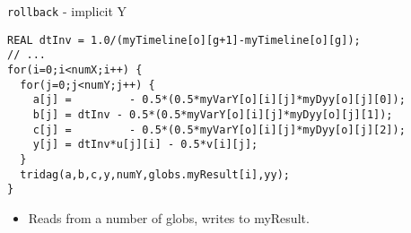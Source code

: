 \documentclass{beamer}
\begin{document}
\begin{frame}[fragile]{\texttt{rollback} - implicit Y}
\begin{lstlisting}[basicstyle=\tiny\ttfamily]
REAL dtInv = 1.0/(myTimeline[o][g+1]-myTimeline[o][g]);
// ...
for(i=0;i<numX;i++) {
  for(j=0;j<numY;j++) {
    a[j] =         - 0.5*(0.5*myVarY[o][i][j]*myDyy[o][j][0]);
    b[j] = dtInv - 0.5*(0.5*myVarY[o][i][j]*myDyy[o][j][1]);
    c[j] =         - 0.5*(0.5*myVarY[o][i][j]*myDyy[o][j][2]);
    y[j] = dtInv*u[j][i] - 0.5*v[i][j];
  }
  tridag(a,b,c,y,numY,globs.myResult[i],yy);
}
\end{lstlisting}
\begin{itemize}
    \item Reads from a number of globs, writes to myResult.
\end{itemize}
\end{frame}
\end{document}
